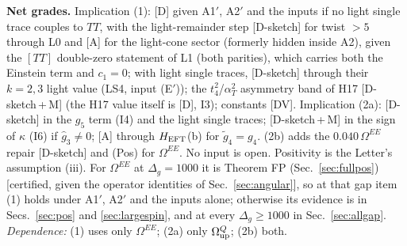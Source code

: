 \documentclass[aps,prl,onecolumn,superscriptaddress,nofootinbib]{revtex4-2}
\begin{document}
\textbf{Net grades.} Implication (1): [D] given A1$'$, A2$'$ and the inputs if no light single trace couples to $TT$, with the light-remainder step [D-sketch] for twist $>5$ through L0 and [A] for the light-cone sector (formerly hidden inside A2), given the $[TT]$ double-zero
statement of L1 (both parities), which carries both the Einstein term and $c_1=0$; with light single traces, [D-sketch] through their $k=2,3$ light value (LS4, input (E$'$));
the $t_4^2$/$\alpha_T^2$ asymmetry band of H17 [D-sketch\,+\,M] (the H17 value itself is [D], I3); constants [DV]. Implication (2a): [D-sketch] in the $g_5$ term (I4) and the
light single traces; [D-sketch\,+\,M] in the sign of $\kappa$ (I6) if $\hat g_3\ne0$; [A] through $H_{\rm EFT}$(b) for
$\tilde g_4=g_4$. (2b) adds the $0.040\,\Omega^{EE}$ repair [D-sketch] and (Pos) for $\Omega^{EE}$. No input is open.
Positivity is the Letter's assumption (iii). For $\Omega^{EE}$ at $\Delta_g=1000$ it is Theorem FP (Sec.~\ref{sec:fullpos}) [certified, given the
operator identities of Sec.~\ref{sec:angular}], so at that gap item (1) holds under A1$'$, A2$'$ and the inputs alone; otherwise its evidence is in
Secs.~\ref{sec:pos} and \ref{sec:largespin}, and at every $\Delta_g\ge1000$ in Sec.~\ref{sec:allgap}. \emph{Dependence:} (1) uses only $\Omega^{EE}$; (2a) only
$\Omega^Q_{\rm up}$; (2b) both.
\end{document}
